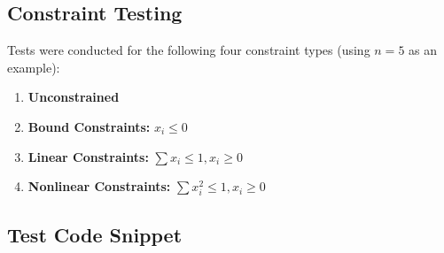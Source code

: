 \documentclass[a4paper,12pt]{article}
\begin{document}
\subsection{Constraint Testing}
Tests were conducted for the following four constraint types (using $n=5$ as an example):
\begin{enumerate}
    \item \textbf{Unconstrained}
    \item \textbf{Bound Constraints:} $x_i \le 0$
    \item \textbf{Linear Constraints:} $\sum x_i \le 1, x_i \ge 0$
    \item \textbf{Nonlinear Constraints:} $\sum x_i^2 \le 1, x_i \ge 0$
\end{enumerate}

\subsection{Test Code Snippet}
\end{document}
